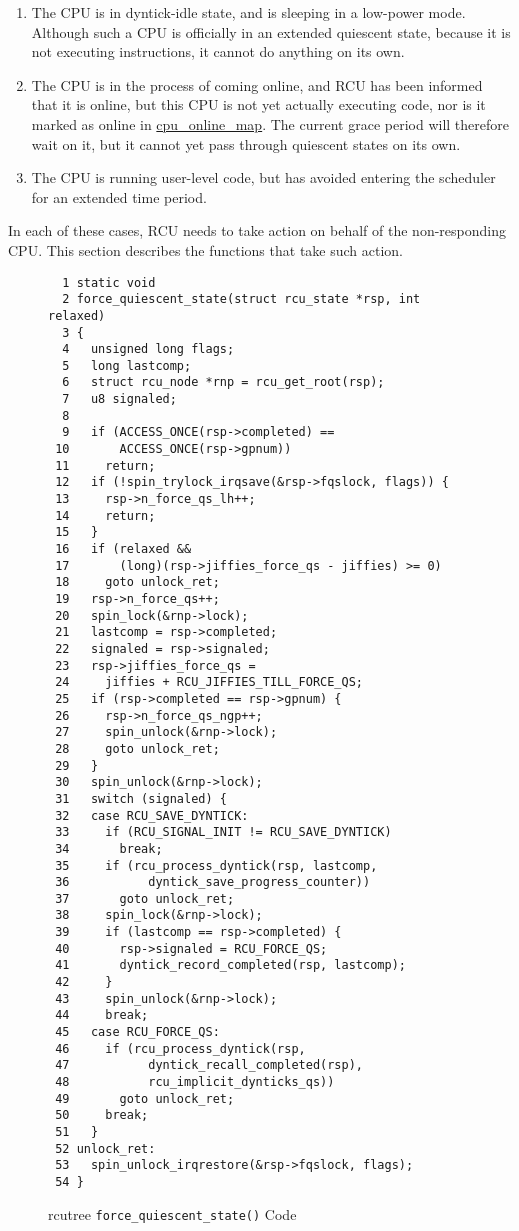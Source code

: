 \begin{enumerate}
\item	The CPU is in dyntick-idle state, and is sleeping in a low-power
	mode.
	Although such a CPU is officially in an extended quiescent state,
	because it is not executing instructions, it cannot do anything
	on its own.
\item	The CPU is in the process of coming online, and RCU has been
	informed that it is online, but this CPU is not yet actually
	executing code, nor is it marked as online in \url{cpu_online_map}.
	The current grace period will therefore wait on it, but it cannot
	yet pass through quiescent states on its own.
\item	The CPU is running user-level code, but has avoided
	entering the scheduler for an extended time period.
\end{enumerate}

In each of these cases, RCU needs to take action on behalf of the
non-responding CPU.
This section describes the functions that take such action.


\begin{figure}[htbp]
{ \scriptsize
\begin{verbatim}
  1 static void
  2 force_quiescent_state(struct rcu_state *rsp, int relaxed)
  3 {
  4   unsigned long flags;
  5   long lastcomp;
  6   struct rcu_node *rnp = rcu_get_root(rsp);
  7   u8 signaled;
  8 
  9   if (ACCESS_ONCE(rsp->completed) ==
 10       ACCESS_ONCE(rsp->gpnum))
 11     return;
 12   if (!spin_trylock_irqsave(&rsp->fqslock, flags)) {
 13     rsp->n_force_qs_lh++;
 14     return;
 15   }
 16   if (relaxed &&
 17       (long)(rsp->jiffies_force_qs - jiffies) >= 0)
 18     goto unlock_ret;
 19   rsp->n_force_qs++;
 20   spin_lock(&rnp->lock);
 21   lastcomp = rsp->completed;
 22   signaled = rsp->signaled;
 23   rsp->jiffies_force_qs =
 24     jiffies + RCU_JIFFIES_TILL_FORCE_QS;
 25   if (rsp->completed == rsp->gpnum) {
 26     rsp->n_force_qs_ngp++;
 27     spin_unlock(&rnp->lock);
 28     goto unlock_ret;
 29   }
 30   spin_unlock(&rnp->lock);
 31   switch (signaled) {
 32   case RCU_SAVE_DYNTICK:
 33     if (RCU_SIGNAL_INIT != RCU_SAVE_DYNTICK)
 34       break;
 35     if (rcu_process_dyntick(rsp, lastcomp,
 36           dyntick_save_progress_counter))
 37       goto unlock_ret;
 38     spin_lock(&rnp->lock);
 39     if (lastcomp == rsp->completed) {
 40       rsp->signaled = RCU_FORCE_QS;
 41       dyntick_record_completed(rsp, lastcomp);
 42     }
 43     spin_unlock(&rnp->lock);
 44     break;
 45   case RCU_FORCE_QS:
 46     if (rcu_process_dyntick(rsp,
 47           dyntick_recall_completed(rsp),
 48           rcu_implicit_dynticks_qs))
 49       goto unlock_ret;
 50     break;
 51   }
 52 unlock_ret:
 53   spin_unlock_irqrestore(&rsp->fqslock, flags);
 54 }
\end{verbatim}
}
\caption{rcutree {\tt force\_quiescent\_state()} Code}
\label{fig:app:rcuimpl:rcutreewt:Code for rcutree force-quiescent-state}
\end{figure}

